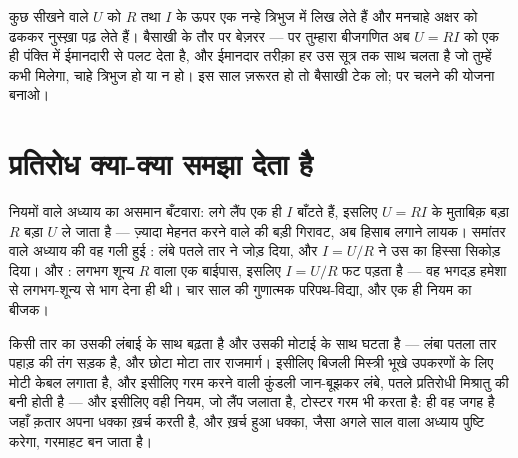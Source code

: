 \begin{remark}[त्रिभुज वाली बैसाखी]\label{rem:g8:ohms-law:triangle}
कुछ सीखने वाले $U$ को $R$ तथा $I$ के ऊपर एक नन्हे त्रिभुज में लिख
लेते हैं और मनचाहे अक्षर को ढककर नुस्ख़ा पढ़ लेते हैं। बैसाखी के तौर
पर बेज़रर --- पर तुम्हारा बीजगणित अब $U = R I$ को एक ही पंक्ति में
ईमानदारी से पलट देता है, और ईमानदार तरीक़ा हर उस सूत्र तक साथ चलता है
जो तुम्हें कभी मिलेगा, चाहे त्रिभुज हो या न हो। इस साल ज़रूरत हो तो
बैसाखी टेक लो; पर चलने की योजना बनाओ।
\end{remark}

\section{प्रतिरोध क्या-क्या समझा देता है}

\begin{example}[पुरानी पहेलियाँ, एक ही बीजक पर]\label{ex:g8:ohms-law:mysteries}
नियमों वाले अध्याय का असमान  बँटवारा:  लगे लैंप एक
ही $I$ बाँटते हैं, इसलिए $U = R I$ के मुताबिक़ बड़ा $R$ बड़ा $U$ ले
जाता है --- ज़्यादा मेहनत करने वाले की बड़ी गिरावट, अब हिसाब लगाने
लायक। समांतर वाले अध्याय की वह गली हुई : लंबे पतले तार ने 
जोड़ दिया, और $I = U/R$ ने उस  का हिस्सा सिकोड़ दिया। और :
लगभग शून्य $R$ वाला एक बाईपास, इसलिए $I = U/R$ फट पड़ता है --- वह
भगदड़ हमेशा से लगभग-शून्य से भाग देना ही थी। चार साल की गुणात्मक
परिपथ-विद्या, और एक ही नियम का बीजक।
\end{example}

\begin{example}[तार, मीटर के हिसाब से]\label{ex:g8:ohms-law:wires}
किसी तार का  उसकी लंबाई के साथ बढ़ता है और उसकी मोटाई के साथ
घटता है --- लंबा पतला तार पहाड़ की तंग सड़क है, और छोटा मोटा तार
राजमार्ग। इसीलिए बिजली मिस्त्री भूखे उपकरणों के लिए मोटी केबल लगाता
है, और इसीलिए गरम करने वाली कुंडली जान-बूझकर लंबे, पतले प्रतिरोधी
मिश्रातु की बनी होती है --- और इसीलिए वही नियम, जो लैंप जलाता है,
टोस्टर गरम भी करता है:  ही वह जगह है जहाँ क़तार अपना धक्का
ख़र्च करती है, और ख़र्च हुआ धक्का, जैसा अगले साल  वाला अध्याय
पुष्टि करेगा, गरमाहट बन जाता है।
\end{example}

